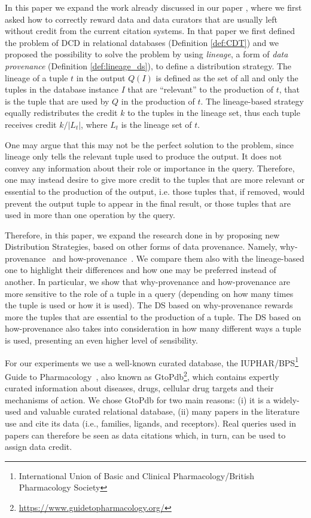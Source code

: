 In this paper we expand the work already discussed in our paper \citep{dosso2020data}, where we first asked how to correctly reward data and data curators that are usually left without credit from the current citation systems.
In that paper we first defined the problem of DCD in relational databases (Definition \ref{def:CDT}) and we proposed the possibility to solve the problem by using \emph{lineage}, a form of \emph{data provenance} (Definition \ref{def:lineage_ds}), to define a distribution strategy.
The lineage of a tuple $t$ in the output $Q(I)$ is defined as the set of all and only the tuples in the database instance $I$ that are ``relevant'' to the production of $t$, that is the tuple that are used by $Q$ in the production of $t$. 
The lineage-based strategy equally redistributes the credit $k$ to the tuples in the lineage set, thus each tuple receives credit $k/|L_t|$, where $L_t$ is the lineage set of $t$. 

One may argue that this may not be the perfect solution to the problem, since lineage only tells the relevant tuple used to produce the output. It does not convey any information about their role or importance in the query.
Therefore, one may instead desire to give more credit to the tuples that are more relevant or essential to the production of the output, i.e. those tuples that, if removed, would prevent the output tuple to appear in the final result, or those tuples that are used in more than one operation by the query. 

Therefore, in this paper, we expand the research done in \citep{dosso2020data} by proposing new Distribution Strategies, based on other forms of data provenance. 
Namely, why-provenance~\citep{WhyProvBuneman} and how-provenance~\cite{howProvenanceGreen}. 
We compare them also with the lineage-based one to highlight their differences and how one may be preferred instead of another. 
In particular, we show that why-provenance and how-provenance are more sensitive to the role of a tuple in a query (depending on how many times the tuple is used or how it is used). 
The DS based on why-provenance rewards more the tuples that are essential to the production of a tuple.
The DS based on how-provenance also takes into consideration in how many different ways a tuple is used, presenting an even higher level of sensibility. 

For our experiments we use a well-known curated database, the IUPHAR/BPS\footnote{International Union of Basic and Clinical Pharmacology/British Pharmacology Society} Guide to Pharmacology~\citep{iuphar2018}, also known as GtoPdb\footnote{\url{https://www.guidetopharmacology.org/}}, which contains expertly curated information about diseases, drugs, cellular drug targets and their mechanisms of action.
We chose GtoPdb for two main reasons: (i) it is a widely-used and valuable curated relational database, (ii) many papers in the literature use and cite its data (i.e., families, ligands, and receptors). 
Real queries used in papers can therefore be seen as data citations which, in turn, can be used to assign data credit.

